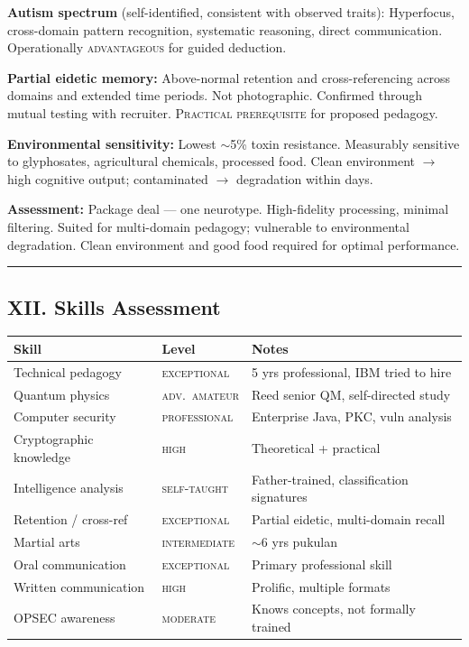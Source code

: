 \textbf{Autism spectrum} (self-identified, consistent with observed traits): Hyperfocus, cross-domain pattern recognition, systematic reasoning, direct communication. Operationally \textsc{advantageous} for guided deduction.

\textbf{Partial eidetic memory:} Above-normal retention and cross-referencing across domains and extended time periods. Not photographic. Confirmed through mutual testing with recruiter. \textsc{Practical prerequisite} for proposed pedagogy.

\textbf{Environmental sensitivity:} Lowest $\sim$5\% toxin resistance. Measurably sensitive to glyphosates, agricultural chemicals, processed food. Clean environment $\rightarrow$ high cognitive output; contaminated $\rightarrow$ degradation within days.

\textbf{Assessment:} Package deal --- one neurotype. High-fidelity processing, minimal filtering. Suited for multi-domain pedagogy; vulnerable to environmental degradation. Clean environment and good food required for optimal performance.

\vspace{1cm}\hrule\vspace{1cm}

\subsection*{XII. Skills Assessment}
\label{interlude:skills-assessment}

{%
\small
\begin{tabular}{p{3.5cm} p{3cm} p{7cm}}
\hline
\textbf{Skill} & \textbf{Level} & \textbf{Notes} \\
\hline
Technical pedagogy & \textsc{exceptional} & 5 yrs professional, IBM tried to hire \\
Quantum physics & \textsc{adv.\ amateur} & Reed senior QM, self-directed study \\
Computer security & \textsc{professional} & Enterprise Java, PKC, vuln analysis \\
Cryptographic knowledge & \textsc{high} & Theoretical + practical \\
Intelligence analysis & \textsc{self-taught} & Father-trained, classification signatures \\
Retention / cross-ref & \textsc{exceptional} & Partial eidetic, multi-domain recall \\
Martial arts & \textsc{intermediate} & $\sim$6 yrs pukulan \\
Oral communication & \textsc{exceptional} & Primary professional skill \\
Written communication & \textsc{high} & Prolific, multiple formats \\
OPSEC awareness & \textsc{moderate} & Knows concepts, not formally trained \\
\hline
\end{tabular}
}%

